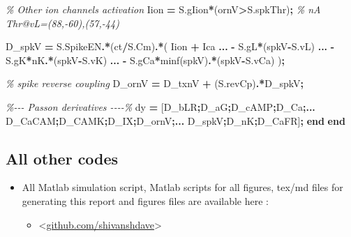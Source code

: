 \documentclass[
]{article}
\newenvironment{Shaded}{\begin{snugshade}}{\end{snugshade}}
\newcommand{\CommentTok}[1]{\textcolor[rgb]{0.56,0.35,0.01}{\textit{#1}}}
\newcommand{\ControlFlowTok}[1]{\textcolor[rgb]{0.13,0.29,0.53}{\textbf{#1}}}
\newcommand{\NormalTok}[1]{#1}
\newcommand{\OperatorTok}[1]{\textcolor[rgb]{0.81,0.36,0.00}{\textbf{#1}}}
\providecommand{\tightlist}{%
  \setlength{\itemsep}{0pt}\setlength{\parskip}{0pt}}
\begin{document}
\begin{Shaded}
\begin{Highlighting}[]
        \CommentTok{\% Other ion channels activation}
\NormalTok{        Iion }\OperatorTok{=}\NormalTok{ S.gIion}\OperatorTok{*}\NormalTok{(ornV}\OperatorTok{\textgreater{}}\NormalTok{S.spkThr)}\OperatorTok{;} \CommentTok{\% nA Thr@vL=(88,{-}60),(57,{-}44)    }

\NormalTok{        D\_spkV }\OperatorTok{=}\NormalTok{ S.SpikeEN}\OperatorTok{.*}\NormalTok{(ct}\OperatorTok{/}\NormalTok{S.Cm)}\OperatorTok{.*}\NormalTok{( Iion }\OperatorTok{+}\NormalTok{ Ica }\OperatorTok{...} 
            \OperatorTok{{-}}\NormalTok{ S.gL}\OperatorTok{*}\NormalTok{(spkV}\OperatorTok{{-}}\NormalTok{S.vL) }\OperatorTok{...} 
            \OperatorTok{{-}}\NormalTok{ S.gK}\OperatorTok{*}\NormalTok{nK}\OperatorTok{.*}\NormalTok{(spkV}\OperatorTok{{-}}\NormalTok{S.vK) }\OperatorTok{...}
            \OperatorTok{{-}}\NormalTok{ S.gCa}\OperatorTok{*}\NormalTok{minf(spkV)}\OperatorTok{.*}\NormalTok{(spkV}\OperatorTok{{-}}\NormalTok{S.vCa) )}\OperatorTok{;}

        \CommentTok{\% spike reverse coupling}
\NormalTok{        D\_ornV }\OperatorTok{=}\NormalTok{ D\_txnV }\OperatorTok{+}\NormalTok{ (S.revCp)}\OperatorTok{.*}\NormalTok{D\_spkV}\OperatorTok{;}
                
        \CommentTok{\%{-}{-}{-} Passon derivatives {-}{-}{-}{-}\%}
\NormalTok{        dy }\OperatorTok{=}\NormalTok{ [D\_bLR}\OperatorTok{;}\NormalTok{D\_aG}\OperatorTok{;}\NormalTok{D\_cAMP}\OperatorTok{;}\NormalTok{D\_Ca}\OperatorTok{;...}
\NormalTok{            D\_CaCAM}\OperatorTok{;}\NormalTok{D\_CAMK}\OperatorTok{;}\NormalTok{D\_IX}\OperatorTok{;}\NormalTok{D\_ornV}\OperatorTok{;...}
\NormalTok{            D\_spkV}\OperatorTok{;}\NormalTok{D\_nK}\OperatorTok{;}\NormalTok{D\_CaFR]}\OperatorTok{;} 
    \ControlFlowTok{end}
\ControlFlowTok{end}
\end{Highlighting}
\end{Shaded}

\hypertarget{all-other-codes}{%
\subsection*{All other codes}\label{all-other-codes}}

\begin{itemize}
\tightlist
\item
  All Matlab simulation script, Matlab scripts for all figures, tex/md files for generating this report and figures files are available here :

  \begin{itemize}
  \tightlist
  \item
    \textless{}\href{https://github.com/shivanshdave/Spiking_ORN}{github.com/shivanshdave}\textgreater{}
  \end{itemize}
\end{itemize}
\end{document}
